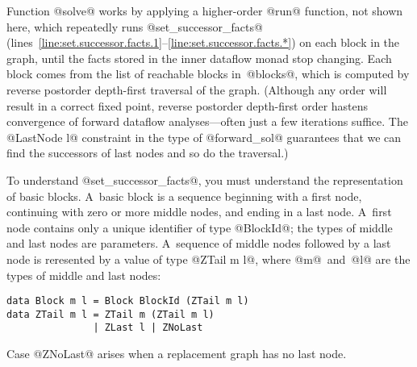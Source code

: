 \documentclass[blockstyle,preprint,natbib,nocopyrightspace]{sigplanconf}
\newcommand\linerangeref[2]{\mbox{lines~\ref{line:#1}--\ref{line:#2}}}
\begin{document}
Function @solve@ works by applying a higher-order @run@ function,
not shown here,
which repeatedly runs
@set_successor_facts@
(\linerangeref{set.successor.facts.1}{set.successor.facts.*})
on each block in the graph, until the facts
stored in the inner dataflow monad stop changing.
Each block comes from  the list of reachable blocks in~@blocks@,
which is computed by reverse postorder depth-first traversal of the graph.
(Although any order will result in a correct fixed point,
reverse postorder depth-first order hastens convergence of forward dataflow
analyses---often just a few iterations suffice.
The @LastNode l@ constraint in the type of @forward_sol@
guarantees that we can
  find the successors of last nodes and so do the traversal.)



To understand @set_successor_facts@, you must understand the
representation of basic blocks.
A~basic block is a sequence beginning with a first node, continuing
with zero or more middle nodes, and ending in a last node.
A~first node contains only a unique identifier of type @BlockId@; the
types of middle and last nodes are parameters.
A~sequence of middle nodes followed by a last node is reresented by a
value of type @ZTail m l@, where @m@~and~@l@
are the types of middle and last nodes:
\begin{verbatim}
data Block m l = Block BlockId (ZTail m l)
data ZTail m l = ZTail m (ZTail m l) 
               | ZLast l | ZNoLast
\end{verbatim}
Case @ZNoLast@ arises when a replacement graph has no last node.
\end{document}
